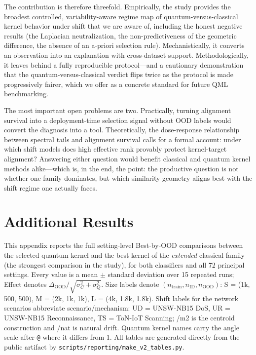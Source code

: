 \documentclass[journal]{IEEEtran}
\begin{document}
The contribution is therefore threefold. Empirically, the study provides the broadest controlled, variability-aware regime map of quantum-versus-classical kernel behavior under shift that we are aware of, including the honest negative results (the Laplacian neutralization, the non-predictiveness of the geometric difference, the absence of an a-priori selection rule). Mechanistically, it converts an observation into an explanation with cross-dataset support. Methodologically, it leaves behind a fully reproducible protocol---and a cautionary demonstration that the quantum-versus-classical verdict flips twice as the protocol is made progressively fairer, which we offer as a concrete standard for future QML benchmarking.

The most important open problems are two. Practically, turning alignment survival into a deployment-time selection signal without OOD labels would convert the diagnosis into a tool. Theoretically, the dose-response relationship between spectral tails and alignment survival calls for a formal account: under which shift models does high effective rank provably protect kernel-target alignment? Answering either question would benefit classical and quantum kernel methods alike---which is, in the end, the point: the productive question is not whether one family dominates, but which similarity geometry aligns best with the shift regime one actually faces.

\appendices

\section{Additional Results}
\label{app:additional_results}

This appendix reports the full setting-level Best-by-OOD comparisons between the selected quantum kernel and the best kernel of the \emph{extended} classical family (the strongest comparison in the study), for both classifiers and all 72 principal settings. Every value is a mean $\pm$ standard deviation over 15 repeated runs; Effect denotes $\Delta_{\mathrm{OOD}}/\sqrt{\sigma_C^2+\sigma_Q^2}$. Size labels denote $(n_{\mathrm{train}}, n_{\mathrm{ID}}, n_{\mathrm{OOD}})$: S = (1k, 500, 500), M = (2k, 1k, 1k), L = (4k, 1.8k, 1.8k). Shift labels for the network scenarios abbreviate scenario/mechanism: UD = UNSW-NB15 DoS, UR = UNSW-NB15 Reconnaissance, TS = ToN-IoT Scanning; /m2 is the centroid construction and /nat is natural drift. Quantum kernel names carry the angle scale after \texttt{@} where it differs from 1. All tables are generated directly from the public artifact by \texttt{scripts/reporting/make\_v2\_tables.py}.
\end{document}
